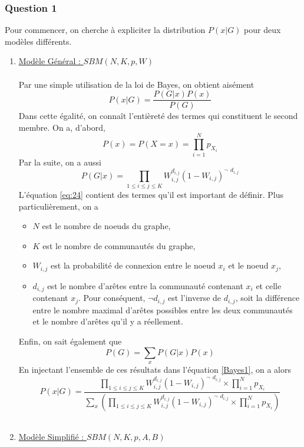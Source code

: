\documentclass[a4paper, 11pt]{article}
\begin{document}
\subsubsection{Question 1}\label{211}
Pour commencer, on cherche à expliciter la distribution $P(x|G)$ pour deux modèles différents.
\begin{enumerate}
    \item \underline{Modèle Général : $SBM (N,K,p,W)$}\\\\
    
    Par une simple utilisation de la loi de Bayes, on obtient aisément
    \begin{equation}
        P(x|G)=\frac{P(G|x)P(x)}{P(G)}
        \label{Bayes1}
    \end{equation}
    Dans cette égalité, on connaît l'entièreté des termes qui constituent le second membre. On a, d'abord,
    \begin{equation}
        P(x)=P(X=x)=\prod^N_{i=1}p_{X_i}
    \end{equation}
    Par la suite, on a aussi
    \begin{equation}
        P(G|x)=\prod_{1\le i \le j \le K} W_{i,j}^{d_{i,j}} (1-W_{i,j})^{\lnot ~
        ~d_{i,j}}
        \label{eq:24}
    \end{equation}
    L'équation  \ref{eq:24} contient des termes qu'il est important de définir. Plus particulièrement, on a
    \begin{itemize}
        \item $N$ est le nombre de noeuds du graphe,
        \item $K$ est le nombre de communautés du graphe,
        \item $W_{i,j}$ est la probabilité de connexion entre le noeud $x_i$ et le noeud $x_j$,
        \item $d_{i,j}$ est le nombre d'arêtes entre la communauté contenant $x_i$ et celle contenant $x_j$. Pour conséquent, $\lnot d_{i,j}$ est l'inverse de $d_{i,j}$, soit la différence entre le nombre maximal d'arêtes possibles entre les deux communautés et le nombre d'arêtes qu'il y a réellement.
    \end{itemize}
    Enfin, on sait également que
    \begin{equation}
        P(G)=\sum_x P(G|x) P(x)
    \end{equation}
    En injectant l'ensemble de ces résultats dans l'équation \ref{Bayes1}, on a alors
    \begin{equation}
        P(x|G)=\frac{\prod_{1\le i \le j \le K} W_{i,j}^{d_{i,j}} (1-W_{i,j})^{\lnot ~
        ~d_{i,j}} \times \prod^N_{i=1}p_{X_i} }{\sum_x (\prod_{1\le i \le j \le K} W_{i,j}^{d_{i,j}} (1-W_{i,j})^{\lnot ~
        ~d_{i,j}} \times \prod^N_{i=1}p_{X_i}) }
    \end{equation}
    \\
    \item \underline{Modèle Simplifié : $SBM(N,K,p,A,B)$}\\
    

\end{enumerate}
\end{document}
